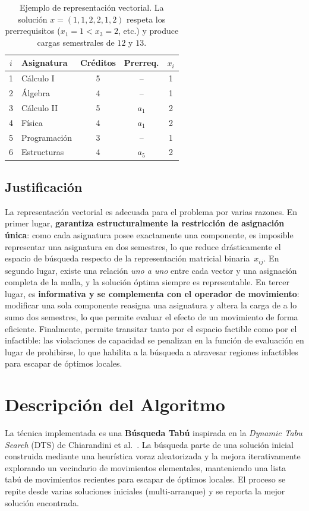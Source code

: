 \documentclass[letter, 10pt]{article}
\begin{document}
\begin{table}[h]
\centering
\begin{tabular}{clccc}
\hline
$i$ & Asignatura & Cr\'editos & Prerreq. & $x_i$ \\
\hline
1 & C\'alculo I    & 5 & --      & 1 \\
2 & \'Algebra      & 4 & --      & 1 \\
3 & C\'alculo II   & 5 & $a_1$   & 2 \\
4 & F\'isica       & 4 & $a_1$   & 2 \\
5 & Programaci\'on & 3 & --      & 1 \\
6 & Estructuras    & 4 & $a_5$   & 2 \\
\hline
\end{tabular}
\caption{Ejemplo de representaci\'on vectorial. La soluci\'on $x=(1,1,2,2,1,2)$ respeta los prerrequisitos ($x_1=1 < x_3=2$, etc.) y produce cargas semestrales de $12$ y $13$.}
\label{tab:rep}
\end{table}

\subsection{Justificaci\'on}
La representaci\'on vectorial es adecuada para el problema por varias razones. En primer lugar, \textbf{garantiza estructuralmente la restricci\'on de asignaci\'on \'unica}: como cada asignatura posee exactamente una componente, es imposible representar una asignatura en dos semestres, lo que reduce dr\'asticamente el espacio de b\'usqueda respecto de la representaci\'on matricial binaria~$x_{ij}$. En segundo lugar, existe una relaci\'on \emph{uno a uno} entre cada vector y una asignaci\'on completa de la malla, y la soluci\'on \'optima siempre es representable. En tercer lugar, es \textbf{informativa y se complementa con el operador de movimiento}: modificar una sola componente reasigna una asignatura y altera la carga de a lo sumo dos semestres, lo que permite evaluar el efecto de un movimiento de forma eficiente. Finalmente, permite transitar tanto por el espacio factible como por el infactible: las violaciones de capacidad se penalizan en la funci\'on de evaluaci\'on en lugar de prohibirse, lo que habilita a la b\'usqueda a atravesar regiones infactibles para escapar de \'optimos locales.

\section{Descripci\'on del Algoritmo}
La t\'ecnica implementada es una \textbf{B\'usqueda Tab\'u} inspirada en la \emph{Dynamic Tabu Search} (DTS) de Chiarandini et al.~\cite{Chiarandini2012}. La b\'usqueda parte de una soluci\'on inicial construida mediante una heur\'istica voraz aleatorizada y la mejora iterativamente explorando un vecindario de movimientos elementales, manteniendo una lista tab\'u de movimientos recientes para escapar de \'optimos locales. El proceso se repite desde varias soluciones iniciales (multi-arranque) y se reporta la mejor soluci\'on encontrada.
\end{document}
